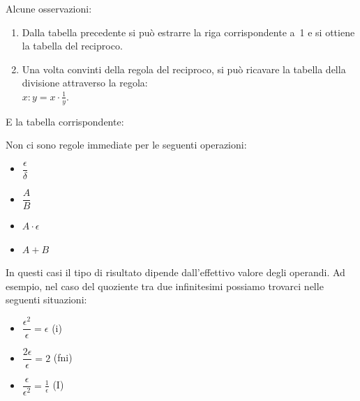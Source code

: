 \begin{multicols}{2}
Alcune osservazioni:
\begin{enumerate} [noitemsep]
 \item Dalla tabella precedente si può estrarre la riga corrispondente a~1
e si ottiene la tabella del reciproco.
 \item Una volta convinti della regola del reciproco, si può ricavare la 
tabella della divisione attraverso la 
regola:\\
$x : y = x \cdot \frac{1}{y}$.
\end{enumerate}
E la tabella corrispondente:
\begin{center}
\renewcommand{\arraystretch}{.0}
\end{center}
\end{multicols}

\begin{osservazione}
Non ci sono regole immediate per le seguenti operazioni:
\begin{multicols}{4}
\begin{itemize} [nosep]
 \item \(\dfrac{\epsilon}{\delta}\)
 \item \(\dfrac{A}{B}\)
 \item \(A \cdot \epsilon\)
 \item \(A + B\)
\end{itemize}
\end{multicols}
In questi casi il tipo di risultato dipende dall'effettivo valore degli 
operandi. Ad esempio, nel caso del quoziente tra due infinitesimi possiamo 
trovarci nelle seguenti situazioni:
\begin{multicols}{3}
\begin{itemize} [nosep]
 \item \(\dfrac{\epsilon^2}{\epsilon} = \epsilon\) \quad (i)
 \item \(\dfrac{2\epsilon}{\epsilon} = 2\) \quad (fni)
 \item \(\dfrac{\epsilon}{\epsilon^2} = \frac{1}{\epsilon}\) \quad (I)
\end{itemize}
\end{multicols}
\end{osservazione}

